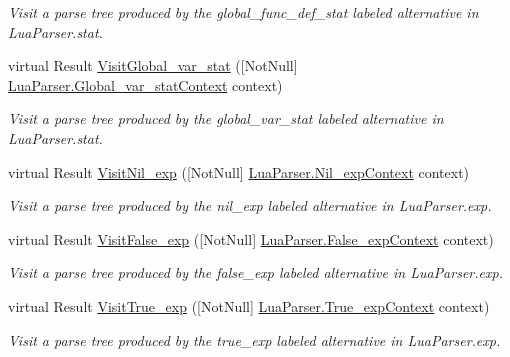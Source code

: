 \begin{DoxyCompactItemize}
\begin{DoxyCompactList}\small\item\em Visit a parse tree produced by the {\ttfamily global\+\_\+func\+\_\+def\+\_\+stat} labeled alternative in Lua\+Parser.\+stat. \end{DoxyCompactList}\item 
virtual Result \mbox{\hyperlink{classzlua_1_1_lua_base_visitor_a0801068996633dcc16867ec54b05a314}{Visit\+Global\+\_\+var\+\_\+stat}} (\mbox{[}Not\+Null\mbox{]} \mbox{\hyperlink{classzlua_1_1_lua_parser_1_1_global__var__stat_context}{Lua\+Parser.\+Global\+\_\+var\+\_\+stat\+Context}} context)
\begin{DoxyCompactList}\small\item\em Visit a parse tree produced by the {\ttfamily global\+\_\+var\+\_\+stat} labeled alternative in Lua\+Parser.\+stat. \end{DoxyCompactList}\item 
virtual Result \mbox{\hyperlink{classzlua_1_1_lua_base_visitor_a8cf392e61aeb04b51f5dab36367615f9}{Visit\+Nil\+\_\+exp}} (\mbox{[}Not\+Null\mbox{]} \mbox{\hyperlink{classzlua_1_1_lua_parser_1_1_nil__exp_context}{Lua\+Parser.\+Nil\+\_\+exp\+Context}} context)
\begin{DoxyCompactList}\small\item\em Visit a parse tree produced by the {\ttfamily nil\+\_\+exp} labeled alternative in Lua\+Parser.\+exp. \end{DoxyCompactList}\item 
virtual Result \mbox{\hyperlink{classzlua_1_1_lua_base_visitor_a4c9fede80d7358d76c558891a1909ab3}{Visit\+False\+\_\+exp}} (\mbox{[}Not\+Null\mbox{]} \mbox{\hyperlink{classzlua_1_1_lua_parser_1_1_false__exp_context}{Lua\+Parser.\+False\+\_\+exp\+Context}} context)
\begin{DoxyCompactList}\small\item\em Visit a parse tree produced by the {\ttfamily false\+\_\+exp} labeled alternative in Lua\+Parser.\+exp. \end{DoxyCompactList}\item 
virtual Result \mbox{\hyperlink{classzlua_1_1_lua_base_visitor_a63cf2709c52b89ca59db1826feef9c30}{Visit\+True\+\_\+exp}} (\mbox{[}Not\+Null\mbox{]} \mbox{\hyperlink{classzlua_1_1_lua_parser_1_1_true__exp_context}{Lua\+Parser.\+True\+\_\+exp\+Context}} context)
\begin{DoxyCompactList}\small\item\em Visit a parse tree produced by the {\ttfamily true\+\_\+exp} labeled alternative in Lua\+Parser.\+exp. \end{DoxyCompactList}\item 

\end{DoxyCompactItemize}
